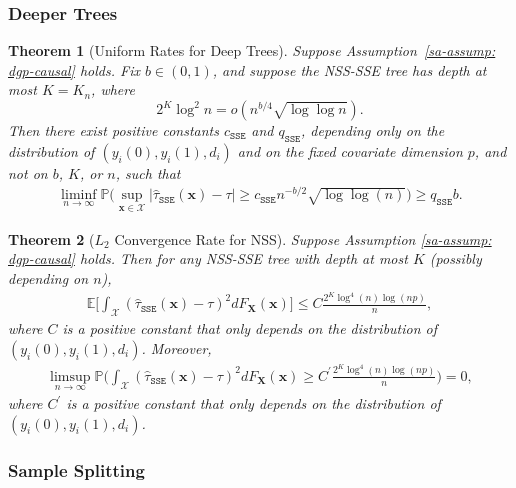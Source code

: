 \documentclass[10pt]{article}
\def\bx{\mathbf{x}}
\def\bX{\mathbf{X}}
\def\X{\mathcal{X}}
\def\E{\mathbb{E}}
\def\P{\mathbb{P}}
\def\SSE{\mathtt{SSE}}
\newtheorem{theorem}{Theorem}%
\theoremstyle{definition}
\theoremstyle{remark}
\begin{document}
\subsubsection*{Deeper Trees}

\begin{theorem}[Uniform Rates for Deep Trees]\label{sa-thm: uniform minimax rates regression fit}
Suppose Assumption~\ref{sa-assump: dgp-causal} holds. Fix $b \in (0, 1)$, and suppose the NSS-SSE tree has depth at most $K=K_n$, where
\[
    2^K\log^2 n
    =
    o\!\left(n^{b/4}\sqrt{\log\log n}\right).
\]
Then there exist positive constants $c_{\SSE}$ and $q_{\SSE}$, depending only on the distribution of $(y_i(0),y_i(1),d_i)$ and on the fixed covariate dimension $p$, and not on $b$, $K$, or $n$, such that
\begin{align*}      
    \liminf_{n\to\infty} \mathbb{P}\Bigg(\sup_{\bx\in\mathcal{X}}|\hat\tau_{\mathtt{SSE}}(\bx) - \tau| \geq c_{\SSE} n^{-b/2}\sqrt{\log\log(n)}\Bigg) \geq q_{\SSE} b.
\end{align*}
\end{theorem}

\begin{theorem}[$L_2$ Convergence Rate for NSS]\label{sa-thm: L2 consistency NSS fit}
Suppose Assumption \ref{sa-assump: dgp-causal} holds. Then for any NSS-SSE tree with depth at most $K$ (possibly depending on $n$),
\begin{align*}
    \E \bigg[ \int_{\X} (\hat\tau_{\mathtt{SSE}}(\bx) - \tau)^2 dF_{\bX}(\bx)\bigg] \leq C \frac{2^K \log^4(n) \log(np)}{n},
\end{align*}
where $C$ is a positive constant that only depends on the distribution of $(y_i(0),y_i(1),d_i)$. Moreover, 
\begin{align*}
    \limsup_{n \to \infty} \P \bigg( \int_{\X} (\hat\tau_{\mathtt{SSE}}(\bx) - \tau)^2 dF_{\bX}(\bx) \geq C^{\prime} \frac{2^K \log^4(n) \log(np)}{n}\bigg) = 0,
\end{align*}
where $C^{\prime}$ is a positive constant that only depends on the distribution of $(y_i(0),y_i(1),d_i)$. 
\end{theorem}



\subsubsection{Sample Splitting}
\end{document}
